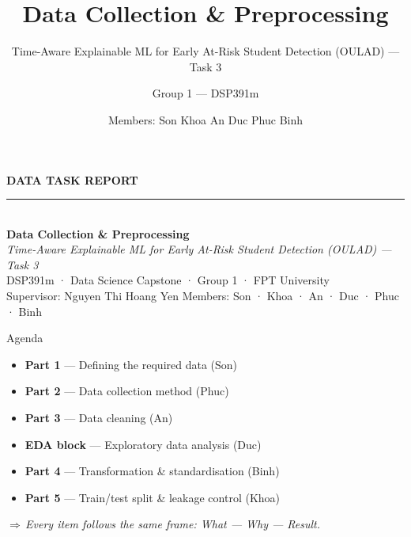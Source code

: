 \documentclass[aspectratio=169,11pt]{beamer}
\title{\textbf{Data Collection \& Preprocessing}}
\subtitle{Time-Aware Explainable ML for Early At-Risk Student Detection (OULAD) — Task 3}
\author{Group 1 — DSP391m}
\institute{FPT University \textbullet{} Supervisor: Nguyen Thi Hoang Yen}
\date{Members: Son \textbullet{} Khoa \textbullet{} An \textbullet{} Duc \textbullet{} Phuc \textbullet{} Binh}
\newcommand{\takeaway}[1]{\vspace{2pt}\par{\footnotesize\itshape\textcolor{themecol}{$\Rightarrow$\,}#1}}
\begin{document}
{
\begin{frame}[plain]
  \vfill\hspace{1.1em}\begin{minipage}{0.92\textwidth}
    {\color{white!85}\large\textbf{DATA TASK REPORT}}\\[6pt]
    {\color{white}\rule{3.2cm}{2.4pt}}\\[10pt]
    {\color{white}\huge\textbf{Data Collection \& Preprocessing}}\\[10pt]
    {\color{white!90}\large\itshape Time-Aware Explainable ML for Early At-Risk Student Detection (OULAD) — Task 3}\\[16pt]
    {\color{white!80}\small DSP391m · Data Science Capstone · Group 1 · FPT University\\
     Supervisor: Nguyen Thi Hoang Yen \quad\textbullet\quad Members: Son · Khoa · An · Duc · Phuc · Binh}
  \end{minipage}\vfill
\end{frame}}

\begin{frame}{Agenda}
  \begin{itemize}\setlength\itemsep{0.5em}
    \item \textbf{Part 1} — Defining the required data \hfill(Son)
    \item \textbf{Part 2} — Data collection method \hfill(Phuc)
    \item \textbf{Part 3} — Data cleaning \hfill(An)
    \item \textbf{EDA block} — Exploratory data analysis \hfill(Duc)
    \item \textbf{Part 4} — Transformation \& standardisation \hfill(Binh)
    \item \textbf{Part 5} — Train/test split \& leakage control \hfill(Khoa)
  \end{itemize}
  \takeaway{Every item follows the same frame: \textit{What — Why — Result}.}
\end{frame}
\end{document}
